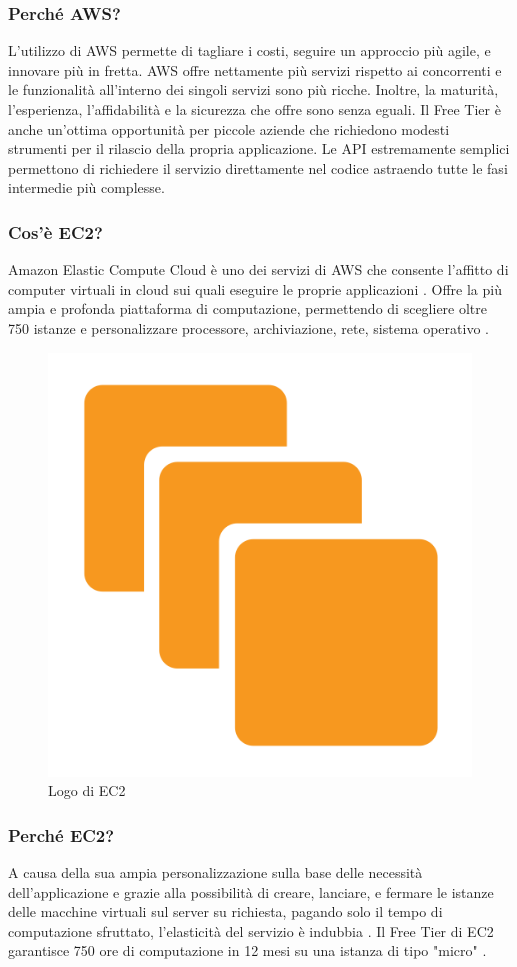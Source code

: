             \subsubsection{Perché AWS? \cite{AWS1}}
                L'utilizzo di AWS permette di tagliare i costi, seguire un approccio più agile, e innovare più in fretta. AWS offre nettamente più servizi rispetto ai concorrenti e le funzionalità all'interno dei singoli servizi sono più ricche. Inoltre, la maturità, l'esperienza, l'affidabilità e la sicurezza che offre sono senza eguali. Il Free Tier è anche un'ottima opportunità per piccole aziende che richiedono modesti strumenti per il rilascio della propria applicazione. Le API estremamente semplici permettono di richiedere il servizio direttamente nel codice astraendo tutte le fasi intermedie più complesse.
            \subsubsection{Cos'è EC2?}
                Amazon Elastic Compute Cloud è uno dei servizi di AWS che consente l'affitto di computer virtuali in cloud sui quali eseguire le proprie applicazioni \cite{Wikipedia6}. Offre la più ampia e profonda piattaforma di computazione, permettendo di scegliere oltre 750 istanze e personalizzare processore, archiviazione, rete, sistema operativo \cite{AWS2}.
            \begin{figure}[htbp!]
                \centering
                \includegraphics[width=0.2\linewidth]{Immagini/System Design/AWS EC2.png}
                \caption{Logo di EC2}
            \end{figure}
            \subsubsection{Perché EC2?}
                A causa della sua ampia personalizzazione sulla base delle necessità dell'applicazione e grazie alla possibilità di creare, lanciare, e fermare le istanze delle macchine virtuali sul server su richiesta, pagando solo il tempo di computazione sfruttato, l'elasticità del servizio è indubbia \cite{Wikipedia6}. Il Free Tier di EC2 garantisce 750 ore di computazione in 12 mesi su una istanza di tipo "micro" \cite{AWS3}. 

